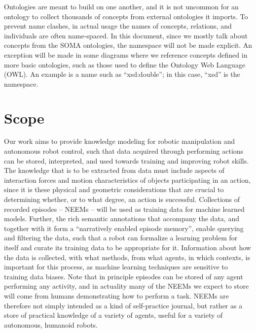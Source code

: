 Ontologies are meant to build on one another, and it is not uncommon for an ontology to collect thousands of concepts from external ontologies it imports. To prevent name clashes, in actual usage the names of concepts, relations, and individuals are often name-spaced. In this document, since we mostly talk about concepts from the SOMA ontologies, the namespace will not be made explicit. An exception will be made in some diagrams where we reference concepts defined in more basic ontologies, such as those used to define the Ontology Web Language (OWL). An example is a name such as ``xsd:double''; in this case, ``xsd'' is the namespace.

\section{Scope} %
\label{sec:scope}

Our work aims to provide knowledge modeling for robotic manipulation and autonomous robot control, such that data acquired through performing actions can be stored, interpreted, and used towards training and improving robot skills. 
The knowledge that is to be extracted from data must include aspects of interaction forces and motion characteristics of objects participating in an action, since it is these physical and geometric considerations that are crucial to determining whether, or to what degree, an action is successful. Collections of recorded episodes -- NEEMs -- will be used as training data for machine learned models. Further, the rich semantic annotations that accompany the data, and together with it form a ``narratively enabled episode memory'', enable querying and filtering the data, such that a robot can formalize a learning problem for itself and curate its training data to be appropriate for it. Information about how the data is collected, with what methods, from what agents, in which contexts, is important for this process, as machine learning techniques are sensitive to training data biases. Note that in principle episodes can be stored of any agent performing any activity, and in actuality many of the NEEMs we expect to store will come from humans demonstrating how to perform a task. NEEMs are therefore not simply intended as a kind of self-practice journal, but rather as a store of practical knowledge of a variety of agents, useful for a variety of autonomous, humanoid robots.

